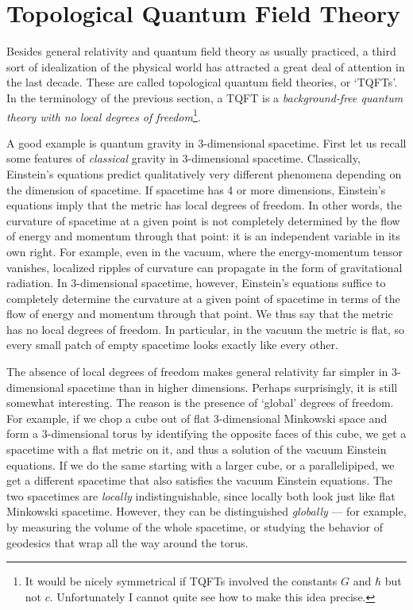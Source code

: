 \documentclass[12pt,amsfonts]{article}
\begin{document}
\section{Topological Quantum Field Theory} \label{TQFT}

Besides general relativity and quantum field theory as usually
practiced, a third sort of idealization of the physical world has
attracted a great deal of attention in the last decade.  These are
called topological quantum field theories, or `TQFTs'.  In the
terminology of the previous section, a TQFT is a {\it background-free
quantum theory with no local degrees of freedom}\footnote{It would be
nicely symmetrical if TQFTs involved the constants $G$ and $\hbar$ but
not $c$.  Unfortunately I cannot quite see how to make this idea precise.}.

A good example is quantum gravity in 3-dimensional spacetime.  First let
us recall some features of {\it classical} gravity in 3-dimensional
spacetime.  Classically, Einstein's equations predict qualitatively very
different phenomena depending on the dimension of spacetime.  If
spacetime has 4 or more dimensions, Einstein's equations imply that the
metric has local degrees of freedom.   In other words, the curvature of
spacetime at a given point is not completely determined by the flow of
energy and momentum through that point: it is an independent variable in
its own right.  For example, even in the vacuum, where the
energy-momentum tensor vanishes, localized ripples of curvature can
propagate in the form of gravitational radiation.  In 3-dimensional
spacetime, however, Einstein's equations suffice to completely determine
the curvature at a given point of spacetime in terms of the flow of
energy and momentum through that point.    We thus say that the metric
has no local degrees of freedom.   In particular, in the vacuum the
metric is flat, so every small patch of empty spacetime looks
exactly like every other.  

The absence of local degrees of freedom makes general relativity far
simpler in 3-dimensional spacetime than in higher dimensions. Perhaps
surprisingly, it is still somewhat interesting.  The reason is the
presence of `global' degrees of freedom.   For example, if we chop a
cube out of flat 3-dimensional Minkowski space and form a 3-dimensional
torus by identifying the opposite faces of this cube, we get a spacetime
with a flat metric on it, and thus a solution of the vacuum Einstein
equations.  If we do the same starting with a larger cube, or a
parallelipiped, we get a different spacetime that also satisfies the
vacuum Einstein equations.  The two spacetimes are {\it locally}
indistinguishable, since locally both look just like flat Minkowski
spacetime.  However, they can be distinguished {\it globally} ---  for
example, by measuring the volume of the whole spacetime, or studying
the behavior of geodesics that wrap all the way around the torus.  
\end{document}
